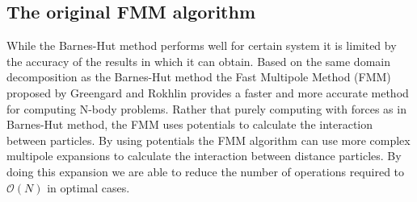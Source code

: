 \subsection{The original FMM algorithm}
While the Barnes-Hut method performs well for certain system it is limited by the accuracy of the results in which it can obtain. Based on the same domain decomposition as the Barnes-Hut method the Fast Multipole Method (FMM) proposed by Greengard and Rokhlin \cite{1988The0-262-7110-X.,Rokhlin1985RapidTheory,Greengard1987ASimulations} provides a faster and more accurate method for computing N-body problems. Rather that purely computing with forces as in Barnes-Hut method, the FMM uses potentials to calculate the interaction between particles. By using potentials the FMM algorithm can use more complex multipole expansions to calculate the interaction between distance particles. By doing this expansion we are able to reduce the number of operations required to $\mathcal{O}(N)$ in optimal cases.

